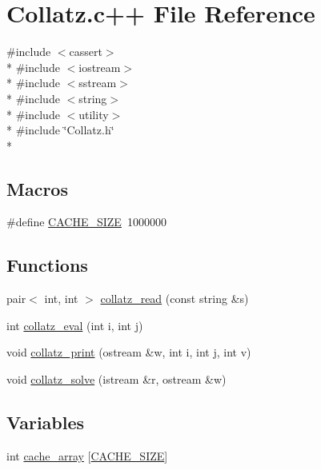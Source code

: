 \hypertarget{Collatz_8c_09_09}{\section{Collatz.\-c++ File Reference}
\label{Collatz_8c_09_09}
}
{\ttfamily \#include $<$cassert$>$}\\*
{\ttfamily \#include $<$iostream$>$}\\*
{\ttfamily \#include $<$sstream$>$}\\*
{\ttfamily \#include $<$string$>$}\\*
{\ttfamily \#include $<$utility$>$}\\*
{\ttfamily \#include \char`\"{}Collatz.\-h\char`\"{}}\\*
\subsection*{Macros}
\begin{DoxyCompactItemize}
\item 
\#define \hyperlink{Collatz_8c_09_09_a8a6befd630ea1c2ab260266f7466540c}{C\-A\-C\-H\-E\-\_\-\-S\-I\-Z\-E}~1000000
\end{DoxyCompactItemize}
\subsection*{Functions}
\begin{DoxyCompactItemize}
\item 
pair$<$ int, int $>$ \hyperlink{Collatz_8c_09_09_aeb2edb6ee16627fa3682f57c7cbf3662}{collatz\-\_\-read} (const string \&s)
\item 
int \hyperlink{Collatz_8c_09_09_a0b0d3827a619c18aa4d96b8ee8b1c47d}{collatz\-\_\-eval} (int i, int j)
\item 
void \hyperlink{Collatz_8c_09_09_aeda0b7ea3e40e1e7487ccc436f33a559}{collatz\-\_\-print} (ostream \&w, int i, int j, int v)
\item 
void \hyperlink{Collatz_8c_09_09_a0ac646d2122741f9a9a52201bf9551cc}{collatz\-\_\-solve} (istream \&r, ostream \&w)
\end{DoxyCompactItemize}
\subsection*{Variables}
\begin{DoxyCompactItemize}
\item 
int \hyperlink{Collatz_8c_09_09_ae60285dddad3520e7d4d7e56440ade6e}{cache\-\_\-array} \mbox{[}\hyperlink{SphereCollatz_8c_09_09_a8a6befd630ea1c2ab260266f7466540c}{C\-A\-C\-H\-E\-\_\-\-S\-I\-Z\-E}\mbox{]}
\end{DoxyCompactItemize}


